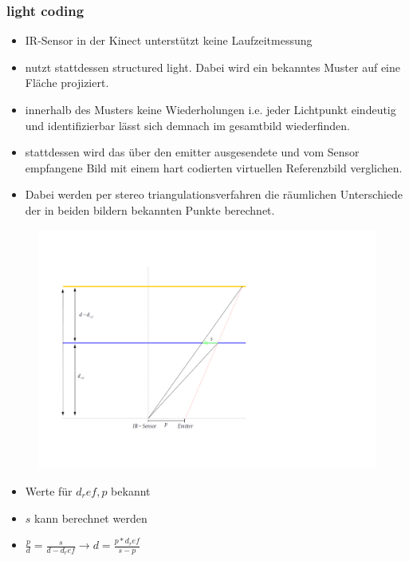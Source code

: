 			\subsubsection{light coding}
			\begin{itemize}
			\item IR-Sensor in der Kinect unterstützt keine Laufzeitmessung
			\item nutzt stattdessen structured light. Dabei wird ein bekanntes Muster auf eine Fläche projiziert.
			\item innerhalb des Musters keine Wiederholungen i.e. jeder Lichtpunkt eindeutig und identifizierbar lässt sich demnach im gesamtbild wiederfinden.
			\item stattdessen wird das über den emitter ausgesendete und vom Sensor empfangene Bild mit einem hart codierten virtuellen Referenzbild verglichen.
			\item Dabei werden per stereo triangulationsverfahren die räumlichen Unterschiede der in beiden bildern bekannten Punkte berechnet.
			\end{itemize}
			\cite{kinect-georg}
			\cite{alpha-centauri-ueberlicht}
			\cite{kinect-uug-chem}
			
			\begin{figure}[H]
			\centering
			\includegraphics[width=0.8\linewidth]{../media/kinect-depth-principle}
			\caption{}
			\label{fig:kinect-depth-principle}
			\end{figure}
			
			\begin{itemize}
			\item Werte für $d_ref, p$ bekannt
			\item $s$ kann berechnet werden
			\item $\frac{p}{d} = \frac{s}{d-d_ref} \rightarrow d = \frac{p*d_ref}{s-p}$
			\end{itemize}

